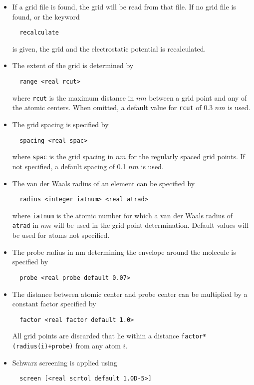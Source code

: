 \begin{itemize}
\item
If a grid file is found, the grid will be read from that file. If no grid
file is found, or the keyword
\begin{verbatim}
  recalculate
\end{verbatim}
is given, the grid and the electrostatic potential is recalculated.
\item
The extent of the grid is determined by
\begin{verbatim}
  range <real rcut>
\end{verbatim}
where \verb+rcut+ is the maximum distance in $nm$ between a grid point and
any of the atomic centers. When omitted, a default value for \verb+rcut+ of
0.3 $nm$ is used.
\item
The grid spacing is specified by
\begin{verbatim}
  spacing <real spac>
\end{verbatim}
where \verb+spac+ is the grid spacing in $nm$ for the regularly spaced
grid points. If not specified, a default spacing of 0.1 $nm$ is used.
\item
The van der Waals radius of an element can be specified by
\begin{verbatim}
  radius <integer iatnum> <real atrad>
\end{verbatim}
where \verb+iatnum+ is the atomic number for which a van der Waals radius
of \verb+atrad+ in $nm$ will be used in the grid point determination.
Default values will be used for atoms not specified.
\item
The probe radius in nm determining the envelope around the molecule is
specified by
\begin{verbatim}
  probe <real probe default 0.07> 
\end{verbatim}
\item
The distance between atomic center and probe center can be multiplied
by a constant factor specified by
\begin{verbatim}
  factor <real factor default 1.0> 
\end{verbatim}
All grid points are discarded that lie within a distance 
\verb-factor*(radius(i)+probe)- from any atom $i$.
\item
Schwarz screening is applied using
\begin{verbatim}
  screen [<real scrtol default 1.0D-5>]
\end{verbatim}
\end{itemize}

